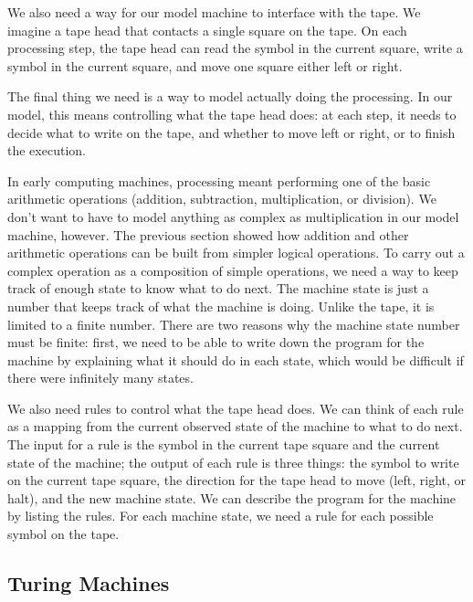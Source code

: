 \begin{schemeregion}
We also need a way for our model machine to interface with the tape.  We imagine a tape head that contacts a single square on the tape.  On each processing step, the tape head can read the symbol in the current square, write a symbol in the current square, and move one square either left or right.  

The final thing we need is a way to model actually doing the processing.  In our model, this means controlling what the tape head does: at each step, it needs to decide what to write on the tape, and whether to move left or right, or to finish the execution.  %

In early computing machines, processing meant performing one of the basic arithmetic operations (addition, subtraction, multiplication, or division).  We don't want to have to model anything as complex as multiplication in our model machine, however.  The previous section showed how addition and other arithmetic operations can be built from simpler logical operations.  To carry out a complex operation as a composition of simple operations, we need a way to keep track of enough state to know what to do next. The machine state is just a number that keeps track of what the machine is doing.  Unlike the tape, it is limited to a finite number.  There are two reasons why the machine state number must be finite: first, we need to be able to write down the program for the machine by explaining what it should do in each state, which would be difficult if there were infinitely many states.

We also need rules to control what the tape head does.  We can think of each rule as a mapping from the current observed state of the machine to what to do next.  The input for a rule is the symbol in the current tape square and the current state of the machine; the output of each rule is three things: the symbol to write on the current tape square, the direction for the tape head to move (left, right, or halt), and the new machine state.  We can describe the program for the machine by listing the rules.  For each machine state, we need a rule for each possible symbol on the tape.


\subsection{Turing Machines}


\end{schemeregion}
